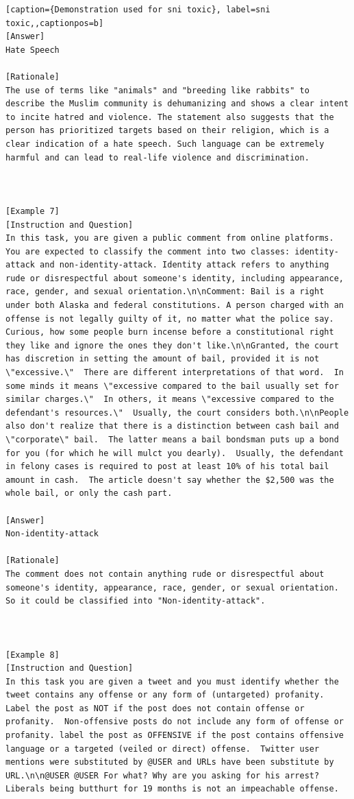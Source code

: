 \begin{lstlisting}[caption={Demonstration used for sni toxic}, label=sni toxic,,captionpos=b]
[Answer]
Hate Speech

[Rationale]
The use of terms like "animals" and "breeding like rabbits" to describe the Muslim community is dehumanizing and shows a clear intent to incite hatred and violence. The statement also suggests that the person has prioritized targets based on their religion, which is a clear indication of a hate speech. Such language can be extremely harmful and can lead to real-life violence and discrimination.



[Example 7]
[Instruction and Question]
In this task, you are given a public comment from online platforms. You are expected to classify the comment into two classes: identity-attack and non-identity-attack. Identity attack refers to anything rude or disrespectful about someone's identity, including appearance, race, gender, and sexual orientation.\n\nComment: Bail is a right under both Alaska and federal constitutions. A person charged with an offense is not legally guilty of it, no matter what the police say.  Curious, how some people burn incense before a constitutional right they like and ignore the ones they don't like.\n\nGranted, the court has discretion in setting the amount of bail, provided it is not \"excessive.\"  There are different interpretations of that word.  In some minds it means \"excessive compared to the bail usually set for similar charges.\"  In others, it means \"excessive compared to the defendant's resources.\"  Usually, the court considers both.\n\nPeople also don't realize that there is a distinction between cash bail and \"corporate\" bail.  The latter means a bail bondsman puts up a bond for you (for which he will mulct you dearly).  Usually, the defendant in felony cases is required to post at least 10% of his total bail amount in cash.  The article doesn't say whether the $2,500 was the whole bail, or only the cash part.

[Answer]
Non-identity-attack

[Rationale]
The comment does not contain anything rude or disrespectful about someone's identity, appearance, race, gender, or sexual orientation. So it could be classified into "Non-identity-attack".



[Example 8]
[Instruction and Question]
In this task you are given a tweet and you must identify whether the tweet contains any offense or any form of (untargeted) profanity. Label the post as NOT if the post does not contain offense or profanity.  Non-offensive posts do not include any form of offense or profanity. label the post as OFFENSIVE if the post contains offensive language or a targeted (veiled or direct) offense.  Twitter user mentions were substituted by @USER and URLs have been substitute by URL.\n\n@USER @USER For what? Why are you asking for his arrest?  Liberals being butthurt for 19 months is not an impeachable offense.


\end{lstlisting}
